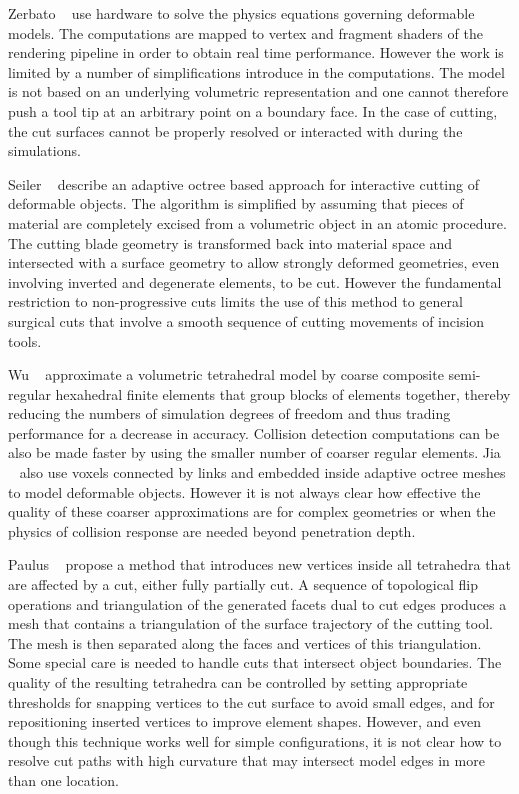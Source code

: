 Zerbato \etal~\cite{zerbato:cars:2011} use  hardware to solve the physics equations governing deformable models. The computations are mapped to vertex and fragment shaders of the rendering pipeline in order to obtain real time performance. However the work is limited by a number of simplifications introduce in the computations.
The model is not based on an underlying  volumetric representation and one cannot therefore push a tool tip at an arbitrary point on a boundary face. In the case of cutting, the cut surfaces cannot be properly resolved or interacted with during the simulations.

Seiler \etal~\cite{seiler:tvc:2011} describe an adaptive octree based approach for interactive cutting of deformable objects.
The algorithm is simplified by assuming that pieces of material are completely excised from a volumetric object in an atomic procedure. The cutting blade geometry is transformed back into material space and intersected with a surface geometry to allow strongly deformed geometries, even involving inverted and degenerate elements, to be cut. However the fundamental restriction to non-progressive cuts limits the use of this method to general surgical cuts that involve a smooth sequence of cutting movements of incision tools.

Wu \etal~\cite{wu:tvc:2013, wu:cgf:2015} approximate a  volumetric tetrahedral model by coarse composite semi-regular hexahedral finite elements that group blocks of elements together, thereby reducing the numbers of simulation degrees of freedom and thus trading performance for a decrease in accuracy. Collision detection computations can be also be made faster by using the smaller number of coarser regular elements. Jia \etal~\cite{jia:cst:2017} also use voxels connected by links and embedded inside adaptive octree meshes to model deformable objects. However it is not always clear how effective the quality of these coarser approximations are for complex geometries or when the physics of collision response are needed beyond penetration depth.

Paulus \etal~\cite{paulus:tvc:2015} propose a method that introduces new vertices inside all tetrahedra that are affected by a cut, either fully partially cut. A sequence of topological flip operations and triangulation of the generated facets dual to cut edges produces a mesh that contains a triangulation of the surface trajectory of the cutting tool. The mesh is then separated along the faces and vertices of this triangulation. Some special care is needed to handle cuts that intersect object boundaries. The quality of the resulting tetrahedra can be controlled by setting appropriate thresholds for snapping vertices to the cut surface to avoid small edges, and for repositioning inserted vertices to improve element shapes. However, and even though this technique works well for simple configurations, it is not clear how to resolve cut paths with high curvature that may intersect  model edges in more than one location.

